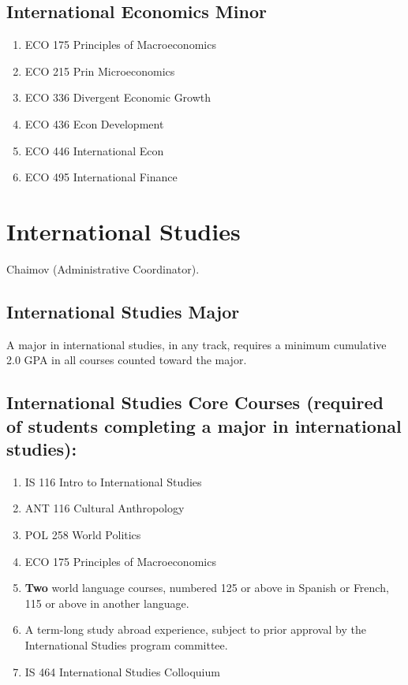 \documentclass[
  letterpaper,
]{scrbook}
\providecommand{\tightlist}{%
  \setlength{\itemsep}{0pt}\setlength{\parskip}{0pt}}
\begin{document}
\subsection{International Economics
Minor}\label{international-economics-minor}

\begin{enumerate}
\def\labelenumi{\arabic{enumi}.}
\tightlist
\item
  ECO 175 Principles of Macroeconomics
\item
  ECO 215 Prin Microeconomics
\item
  ECO 336 Divergent Economic Growth
\item
  ECO 436 Econ Development
\item
  ECO 446 International Econ
\item
  ECO 495 International Finance
\end{enumerate}

\section{International Studies}\label{sec-international-studies}

Chaimov (Administrative Coordinator).

\subsection{International Studies
Major}\label{international-studies-major}

A major in international studies, in any track, requires a minimum
cumulative 2.0 GPA in all courses counted toward the major.

\subsection{International Studies Core Courses (required of students
completing a major in international
studies):}\label{international-studies-core-courses-required-of-students-completing-a-major-in-international-studies}

\begin{enumerate}
\def\labelenumi{\arabic{enumi}.}
\tightlist
\item
  IS 116 Intro to International Studies
\item
  ANT 116 Cultural Anthropology
\item
  POL 258 World Politics
\item
  ECO 175 Principles of Macroeconomics
\item
  \textbf{Two} world language courses, numbered 125 or above in Spanish
  or French, 115 or above in another language.
\item
  A term-long study abroad experience, subject to prior approval by the
  International Studies program committee.
\item
  IS 464 International Studies Colloquium
\end{enumerate}
\end{document}
